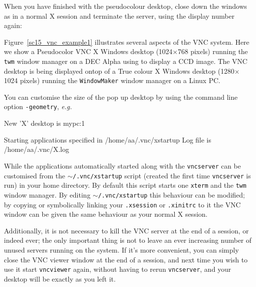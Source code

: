 \documentclass[twoside,11pt]{starlink}
\begin{document}
When you have finished with the pseudocolour desktop, close down the
windows as in a normal X session and terminate the server, using the
display number again:

\begin{small}
\begin{terminalv}
\end{terminalv}
\end{small}

Figure~\ref{sc15_vnc_example1} illustrates several aspects of the VNC
system. Here we show a Pseudocolor VNC X Windows desktop
(1024$\times$768 pixels) running the \texttt{twm} window manager on a DEC
Alpha using  to display a CCD image. The VNC
desktop is being displayed ontop of a True colour X Windows desktop
(1280$\times$1024 pixels) running the \texttt{WindowMaker} window manager
on a Linux PC.

You can customise the size of the pop up desktop by using the command
line option \texttt{-geometry}, \emph{e.g.\ }

\begin{small}
\begin{terminalv}
        New 'X' desktop is mypc:1

        Starting applications specified in /home/aa/.vnc/xstartup
        Log file is /home/aa/.vnc/X.log
\end{terminalv}
\end{small}

While the applications automatically started along with the \texttt{vncserver} can be customised from the \texttt{$\sim$/.vnc/xstartup}
script (created the first time \texttt{vncserver} is run) in your home
directory. By default this script starts one \texttt{xterm} and the \texttt{twm} window manager. By editing \texttt{$\sim$/.vnc/xstartup} this
behaviour can be modified; by copying or symbolically linking your
\texttt{.xsession} or \texttt{.xinitrc} to it the VNC window can be given
the same behaviour as your normal X session.

Additionally, it is not necessary to kill the VNC server at the end of
a session, or indeed ever; the only important thing is not to leave an
ever increasing number of unused servers running on the system. If
it's more convenient, you can simply close the VNC viewer window at
the end of a session, and next time you wish to use it start \texttt{vncviewer} again, without having to rerun \texttt{vncserver}, and your
desktop will be exactly as you left it.
\end{document}
